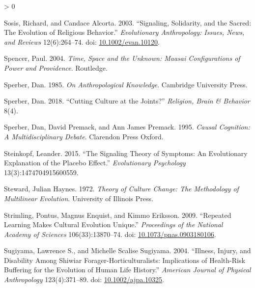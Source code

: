 \documentclass[
  11pt,
]{article}
\newlength{\cslhangindent}
\newenvironment{CSLReferences}[2] %
 {%
  \setlength{\parindent}{0pt}
  \ifodd #1 \everypar{\setlength{\hangindent}{\cslhangindent}}\ignorespaces\fi
  \ifnum #2 > 0
  \setlength{\parskip}{#2\baselineskip}
  \fi
 }%
 {}
\begin{document}
\begin{CSLReferences}{1}{0}
\leavevmode\hypertarget{ref-sosisSignalingSolidaritySacred2003}{}%
Sosis, Richard, and Candace Alcorta. 2003. {``Signaling, Solidarity, and the Sacred: {The} Evolution of Religious Behavior.''} \emph{Evolutionary Anthropology: Issues, News, and Reviews} 12(6):264--74. doi: \href{https://doi.org/10.1002/evan.10120}{10.1002/evan.10120}.

\leavevmode\hypertarget{ref-spencerTimeSpaceUnknown2004}{}%
Spencer, Paul. 2004. \emph{Time, Space and the Unknown: {Maasai} Configurations of Power and Providence}. {Routledge}.

\leavevmode\hypertarget{ref-sperberAnthropologicalKnowledge1985}{}%
Sperber, Dan. 1985. \emph{On Anthropological Knowledge}. {Cambridge University Press}.

\leavevmode\hypertarget{ref-sperberCuttingCultureJoints2018}{}%
Sperber, Dan. 2018. {``Cutting Culture at the Joints?''} \emph{Religion, Brain \& Behavior} 8(4).

\leavevmode\hypertarget{ref-sperberCausalCognitionMultidisciplinary1995}{}%
Sperber, Dan, David Premack, and Ann James Premack. 1995. \emph{Causal Cognition: {A} Multidisciplinary Debate}. {Clarendon Press Oxford}.

\leavevmode\hypertarget{ref-steinkopf2015signaling}{}%
Steinkopf, Leander. 2015. {``The Signaling Theory of Symptoms: An Evolutionary Explanation of the Placebo Effect.''} \emph{Evolutionary Psychology} 13(3):1474704915600559.

\leavevmode\hypertarget{ref-stewardTheoryCultureChange1972}{}%
Steward, Julian Haynes. 1972. \emph{Theory of {Culture Change}: {The Methodology} of {Multilinear Evolution}}. {University of Illinois Press}.

\leavevmode\hypertarget{ref-strimlingRepeatedLearningMakes2009}{}%
Strimling, Pontus, Magnus Enquist, and Kimmo Eriksson. 2009. {``Repeated Learning Makes Cultural Evolution Unique.''} \emph{Proceedings of the National Academy of Sciences} 106(33):13870--74. doi: \href{https://doi.org/10.1073/pnas.0903180106}{10.1073/pnas.0903180106}.

\leavevmode\hypertarget{ref-sugiyamaIllnessInjuryDisability2004}{}%
Sugiyama, Lawrence S., and Michelle Scalise Sugiyama. 2004. {``Illness, Injury, and Disability Among {Shiwiar} Forager-Horticulturalists: {Implications} of Health-Risk Buffering for the Evolution of Human Life History.''} \emph{American Journal of Physical Anthropology} 123(4):371--89. doi: \href{https://doi.org/10.1002/ajpa.10325}{10.1002/ajpa.10325}.


\end{CSLReferences}
\end{document}
